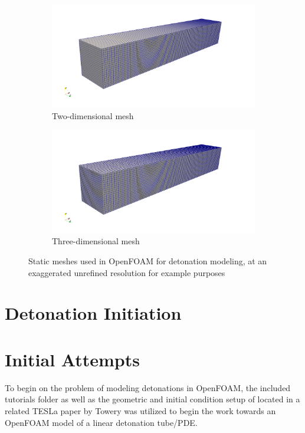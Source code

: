 \begin{figure}[]
    \centering
    \begin{subfigure}[]{\textwidth}
        \centering
        \includegraphics[width=\textwidth]{./figs/mesh/2Dmesh.png}
        \caption{Two-dimensional mesh}
    \end{subfigure}

    \begin{subfigure}[]{\textwidth}
        \centering
        \includegraphics[width=\textwidth]{./figs/mesh/3Dmesh.png}
        \caption{Three-dimensional mesh}
    \end{subfigure}
    \caption{Static meshes used in OpenFOAM for detonation modeling, at an exaggerated unrefined resolution for example purposes}
    \label{fig:meshcompare}
\end{figure}

\section{Detonation Initiation}

\section{Initial Attempts}
To begin on the problem of modeling detonations in OpenFOAM, the included tutorials folder as well as the geometric and initial condition setup of located in a related TESLa paper by Towery\cite{towery1} was utilized to begin the work towards an OpenFOAM model of a linear detonation tube/PDE.

